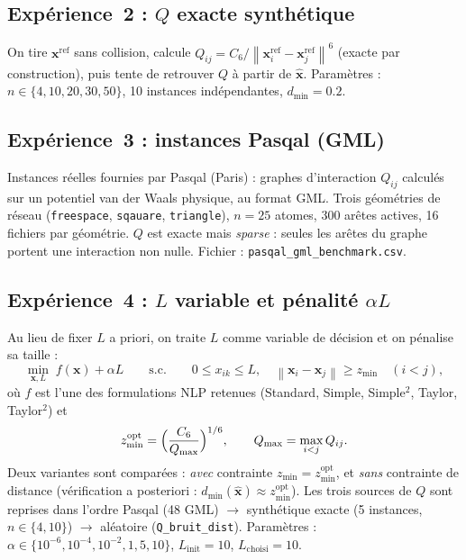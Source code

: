\documentclass[11pt,a4paper]{article}
\theoremstyle{definition}
\theoremstyle{remark}
\newcommand{\norm}[1]{\left\|#1\right\|}
\newcommand{\cSix}{C_6}
\begin{document}
\subsection{Expérience~2 : $Q$ exacte synthétique}
\label{sec:exp2}
On tire $\mathbf{x}^{\mathrm{ref}}$ sans collision, calcule
$Q_{ij} = \cSix/\norm{\mathbf{x}^{\mathrm{ref}}_i-\mathbf{x}^{\mathrm{ref}}_j}^6$
(exacte par construction), puis tente de retrouver $Q$ à partir de
$\hat{\mathbf{x}}$. Paramètres : $n \in \{4,10,20,30,50\}$, 10 instances
indépendantes, $d_{\min} = 0.2$.

\subsection{Expérience~3 : instances Pasqal (GML)}
\label{sec:exp3}
Instances réelles fournies par Pasqal (Paris) : graphes d'interaction
$Q_{ij}$ calculés sur un potentiel van der Waals physique, au format GML.
Trois géométries de réseau (\texttt{freespace}, \texttt{sqauare},
\texttt{triangle}), $n = 25$ atomes, 300 arêtes actives, 16 fichiers
par géométrie. $Q$ est exacte mais \emph{sparse} : seules les arêtes du
graphe portent une interaction non nulle. Fichier :
\texttt{pasqal\_gml\_benchmark.csv}.

\subsection{Expérience~4 : $L$ variable et pénalité $\alpha L$}
\label{sec:exp4}
Au lieu de fixer $L$ a priori, on traite $L$ comme variable de décision et
on pénalise sa taille :
\begin{equation}
  \min_{\mathbf{x},L}\; f(\mathbf{x}) + \alpha L
  \qquad\text{s.c.}\qquad
  0 \leq x_{ik} \leq L,\quad
  \norm{\mathbf{x}_i-\mathbf{x}_j}\ge z_{\min}
  \quad (i<j),
  \label{eq:lvar-obj}
\end{equation}
où $f$ est l'une des formulations NLP retenues (Standard, Simple,
Simple$^2$, Taylor, Taylor$^2$) et
\begin{equation}
  z_{\min}^{\mathrm{opt}}
  = \Bigl(\frac{\cSix}{Q_{\max}}\Bigr)^{1/6},
  \qquad
  Q_{\max}=\max_{i<j} Q_{ij}.
  \label{eq:zmin-opt}
\end{equation}
Deux variantes sont comparées : \emph{avec} contrainte
$z_{\min}=z_{\min}^{\mathrm{opt}}$, et \emph{sans} contrainte de distance
(vérification a posteriori : $d_{\min}(\hat{\mathbf{x}})\approx z_{\min}^{\mathrm{opt}}$).
Les trois sources de $Q$ sont reprises dans l'ordre Pasqal (48 GML) $\to$
synthétique exacte (5 instances, $n\in\{4,10\}$) $\to$ aléatoire
(\texttt{Q\_bruit\_dist}). Paramètres :
$\alpha\in\{10^{-6},10^{-4},10^{-2},1,5,10\}$, $L_{\mathrm{init}}=10$,
$L_{\mathrm{choisi}}=10$.
\end{document}
